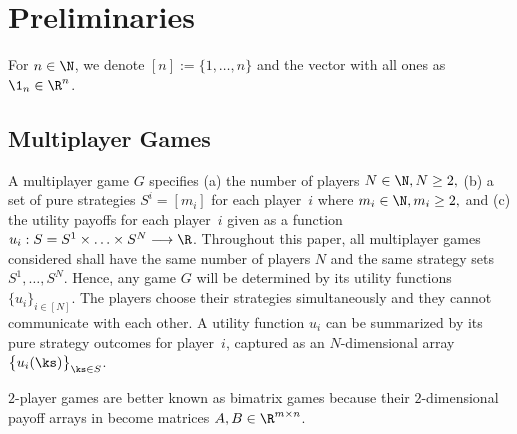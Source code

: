 


\section{Preliminaries}
\label{sec:preliminaries}
\noindent
For $n \in \N$, we denote $[n] := \{1,\ldots,n\}$ and the vector with all ones as $\1_n \in \R^n$.
 


\subsection{Multiplayer Games} 
A multiplayer game $G$ specifies (a) the number of players $N \in \N, N \geq 2,$ (b) a set of pure strategies $S^i = [m_i]$ for each player~$i$ where $m_i \in \N, m_i \geq 2,$ and (c) the utility payoffs for each player~$i$ given as a function $u_i: S = S^1 \times \ldots \times S^N \longrightarrow \R$. Throughout this paper, all multiplayer games considered shall have the same number of players $N$ and the same strategy sets $S^1, \ldots, S^N$. Hence, any game $G$ will be determined by its utility functions $\{u_i\}_{i \in [N]}$. The players choose their strategies simultaneously and they cannot communicate with each other. A utility function $u_i$ can be summarized by its pure strategy outcomes for player~$i$, captured as an $N$-dimensional array $\big\{ u_i(\ks) \big\}_{\ks \in S}$.

\begin{ex}
$2$-player games are better known as bimatrix games because their $2$-dimensional payoff arrays in become matrices $A,B \in \R^{m \times n}$.
\end{ex}

